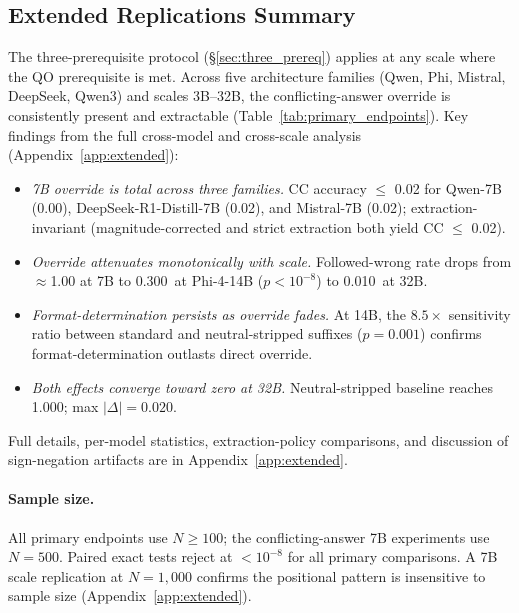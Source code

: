 \documentclass{article}
\theoremstyle{definition}
\theoremstyle{definition}
\newcommand{\PHIFOURCCFW}{0.300}
\newcommand{\PHIFOURCCPVAL}{$p{<}10^{-8}$}
\newcommand{\QWTBCCFW}{0.010}
\begin{document}
\subsection{Extended Replications Summary}
\label{sec:crossmodel_summary}

The three-prerequisite protocol (\S\ref{sec:three_prereq}) applies at any
scale where the QO prerequisite is met. Across five architecture families
(Qwen, Phi, Mistral, DeepSeek, Qwen3) and scales 3B--32B, the
conflicting-answer override is consistently present and extractable
(Table~\ref{tab:primary_endpoints}). Key findings from the full
cross-model and cross-scale analysis (Appendix~\ref{app:extended}):

\begin{itemize}[nosep]
  \item \emph{7B override is total across three families.}
    CC accuracy $\leq$ 0.02 for Qwen-7B (0.00), DeepSeek-R1-Distill-7B
    (0.02), and Mistral-7B (0.02); extraction-invariant (magnitude-corrected
    and strict extraction both yield CC $\leq$ 0.02).
  \item \emph{Override attenuates monotonically with scale.}
    Followed-wrong rate drops from $\approx$1.00 at 7B to
    \PHIFOURCCFW\ at Phi-4-14B (\PHIFOURCCPVAL) to
    \QWTBCCFW\ at 32B.
  \item \emph{Format-determination persists as override fades.}
    At 14B, the $8.5\times$ sensitivity ratio between standard and
    neutral-stripped suffixes ($p{=}0.001$) confirms format-determination
    outlasts direct override.
  \item \emph{Both effects converge toward zero at 32B.}
    Neutral-stripped baseline reaches 1.000; max $|\Delta|{=}0.020$.
\end{itemize}

Full details, per-model statistics, extraction-policy comparisons, and
discussion of sign-negation artifacts are in Appendix~\ref{app:extended}.

\paragraph{Sample size.}
All primary endpoints use $N \geq 100$; the conflicting-answer 7B experiments
use $N{=}500$. Paired exact tests reject at ${<}10^{-8}$ for all primary
comparisons. A 7B scale replication at $N{=}1{,}000$ confirms the positional
pattern is insensitive to sample size (Appendix~\ref{app:extended}).
\end{document}
